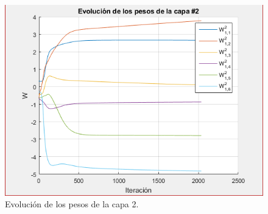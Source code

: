 \documentclass[12pt, titlepage]{article}
\begin{document}
\begin{figure}[H]
    \begin{center}
        \includegraphics[width=12cm]{2/pesos2.png}
        \caption{Evolución de los pesos de la capa 2.}
        \label{fig:pesos4}
    \end{center}
\end{figure}
\end{document}
